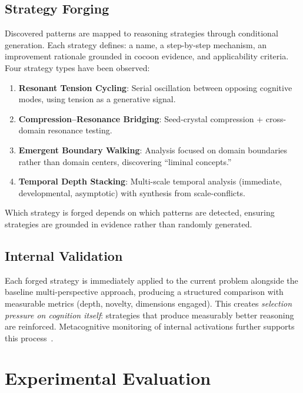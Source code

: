 \documentclass[11pt,a4paper]{article}
\begin{document}
\subsection{Strategy Forging}

Discovered patterns are mapped to reasoning strategies through conditional generation. Each strategy defines: a name, a step-by-step mechanism, an improvement rationale grounded in cocoon evidence, and applicability criteria. Four strategy types have been observed:

\begin{enumerate}[nosep]
  \item \textbf{Resonant Tension Cycling}: Serial oscillation between opposing cognitive modes, using tension as a generative signal.
  \item \textbf{Compression--Resonance Bridging}: Seed-crystal compression + cross-domain resonance testing.
  \item \textbf{Emergent Boundary Walking}: Analysis focused on domain boundaries rather than domain centers, discovering ``liminal concepts.''
  \item \textbf{Temporal Depth Stacking}: Multi-scale temporal analysis (immediate, developmental, asymptotic) with synthesis from scale-conflicts.
\end{enumerate}

Which strategy is forged depends on which patterns are detected, ensuring strategies are grounded in evidence rather than randomly generated.

\subsection{Internal Validation}

Each forged strategy is immediately applied to the current problem alongside the baseline multi-perspective approach, producing a structured comparison with measurable metrics (depth, novelty, dimensions engaged). This creates \emph{selection pressure on cognition itself}: strategies that produce measurably better reasoning are reinforced. Metacognitive monitoring of internal activations further supports this process~\citep{ji2025metacognitive}.

\section{Experimental Evaluation}
\label{sec:experiments}
\end{document}
